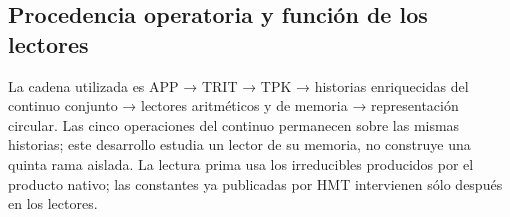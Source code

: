 \subsection{Procedencia operatoria y función de los lectores}
\label{tm-add-m1}

% 
% 
% 
La cadena utilizada es APP → TRIT → TPK → historias enriquecidas del continuo conjunto → lectores aritméticos y de memoria → representación circular. Las cinco operaciones del continuo permanecen sobre las mismas historias; este desarrollo estudia un lector de su memoria, no construye una quinta rama aislada. La lectura prima usa los irreducibles producidos por el producto nativo; las constantes ya publicadas por HMT intervienen sólo después en los lectores.

